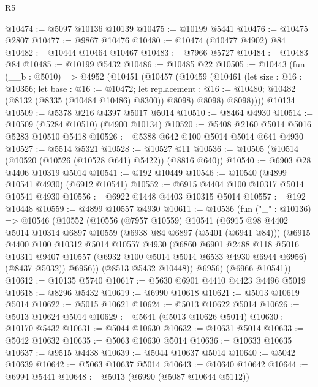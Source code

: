 \begin{lexlean}{R5}
\begin{coremodule}
@10474 := @5097 @10136 @10139
@10475 := @10199 @5441
@10476 := @10475 @2807
@10477 := @9867 @10476
@10480 := @10474 (@10477 @4902) @84
@10482 := @10444 @10464 @10467
@10483 := @7966 @5727
@10484 := @10483 @84
@10485 := @10199 @5432
@10486 := @10485 @22
@10505 := @10443
    (fun (__b : @5010) =>
    @4952
      (@10451
        (@10457
          (@10459
            (@10461
              (let size : @16 := @10356;
              let base : @16 := @10472;
              let replacement : @16 := @10480; @10482 (@8132 (@8335 (@10484 @10486) @8300)) @8098)
              @8098)
            @8098))))
    @10134
@10509 := @5378 @216 @4397 @5017 @5014
@10510 := @8464 @4930
@10514 := @10509 (@5284 @10510) (@4900 @10134)
@10520 := @5408 @2160 @5014 @5016 @5283 @10510 @5418
@10526 := @5388 @642 @100 @5014 @5014 @641 @4930
@10527 := @5514 @5321
@10528 := @10527 @11
@10536 := @10505 (@10514 (@10520 (@10526 (@10528 @641) @5422)) (@8816 @640))
@10540 := @6903 @28 @4406 @10319 @5014
@10541 := @192 @10449
@10546 := @10540 (@4899 @10541 @4930) (@6912 @10541)
@10552 := @6915 @4404 @100 @10317 @5014 @10541 @4930
@10556 := @6922 @1448 @4403 @10315 @5014
@10557 := @192 @10448
@10559 := @4899 @10557 @4930
@10611 := @10536
    (fun ("_" : @10136) =>
    @10546
      (@10552
        (@10556
          (@7957 @10559)
          @10541
          (@6915
            @98
            @4402
            @5014
            @10314
            @6897
            @10559
            (@6938 @84 @6897 (@5401 (@6941 @84)))
            (@6915
              @4400
              @100
              @10312
              @5014
              @10557
              @4930
              (@6860
                @6901
                @2488
                @118
                @5016
                @10311
                @9407
                @10557
                (@6932 @100 @5014 @5014 @6533 @4930 @6944 @6956)
                (@8437 @5032))
              @6956))
          (@8513 @5432 @10448))
        @6956)
      (@6966 @10541))
@10612 := @10135 @5740
@10617 := @5630 @6901 @4410 @4423 @4496 @5019
@10618 := @8296 @5432
@10619 := @6990 @10618
@10621 := @5013 @10619 @5014
@10622 := @5015 @10621
@10624 := @5013 @10622 @5014
@10626 := @5013 @10624 @5014
@10629 := @5641 (@5013 @10626 @5014)
@10630 := @10170 @5432
@10631 := @5044 @10630
@10632 := @10631 @5014
@10633 := @5042 @10632
@10635 := @5063 @10630 @5014
@10636 := @10633 @10635
@10637 := @9515 @4438
@10639 := @5044 @10637 @5014
@10640 := @5042 @10639
@10642 := @5063 @10637 @5014
@10643 := @10640 @10642
@10644 := @6994 @5441
@10648 := @5013 (@6990 (@5087 @10644 @5112))

\end{coremodule}
\end{lexlean}
